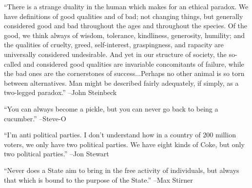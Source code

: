 \documentclass{article}%
\begin{document}
\begin{minipage}{\textwidth}%
\flushleft%
“There is a strange duality in the human which makes for an ethical paradox. We have definitions of good qualities and of bad; not changing things, but generally considered good and bad throughout the ages and throughout the species. Of the good, we think always of wisdom, tolerance, kindliness, generosity, humility; and the qualities of cruelty, greed, self{-}interest, graspingness, and rapacity are universally considered undesirable. And yet in our structure of society, the so{-}called and considered good qualities are invariable concomitants of failure, while the bad ones are the cornerstones of success...Perhaps no other animal is so torn between alternatives. Man might be described fairly adequately, if simply, as a two{-}legged paradox.”%
\linebreak%
\vspace{1mm}%
–John Steinbeck%
\linebreak%
\vspace{1mm}%
\end{minipage}%
\linebreak%
\vspace{1mm}%
\begin{minipage}{\textwidth}%
\flushleft%
“You can always become a pickle, but you can never go back to being a cucumber.”%
\linebreak%
\vspace{1mm}%
–Steve{-}O%
\linebreak%
\vspace{1mm}%
\end{minipage}%
\linebreak%
\vspace{1mm}%
\begin{minipage}{\textwidth}%
\flushleft%
“I'm anti political parties. I don't understand how in a country of 200 million voters, we only have two political parties. We have eight kinds of Coke, but only two political parties.”%
\linebreak%
\vspace{1mm}%
–Jon Stewart%
\linebreak%
\vspace{1mm}%
\end{minipage}%
\linebreak%
\vspace{1mm}%
\begin{minipage}{\textwidth}%
\flushleft%
“Never does a State aim to bring in the free activity of individuals, but always that which is bound to the purpose of the State.”%
\linebreak%
\vspace{1mm}%
–Max Stirner%
\linebreak%
\vspace{1mm}%
\end{minipage}%
\end{document}
